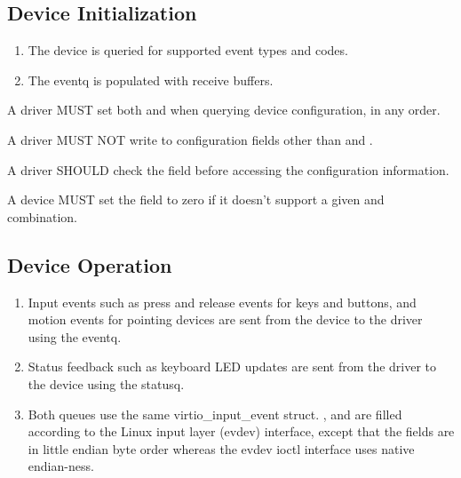 \subsection{Device Initialization}\label{sec:Device Types / Input Device / Device Initialization}

\begin{enumerate}
\item The device is queried for supported event types and codes.
\item The eventq is populated with receive buffers.
\end{enumerate}

A driver MUST set both  and  when querying
  device configuration, in any order.

A driver MUST NOT write to configuration fields other than 
  and .

A driver SHOULD check the  field before accessing the
  configuration information.

A device MUST set the  field to zero if it doesn't support a
  given  and  combination.

\subsection{Device Operation}\label{sec:Device Types / Input Device / Device Operation}

\begin{enumerate}
\item Input events such as press and release events for keys and
  buttons, and motion events for pointing devices are sent from
  the device to the driver using the eventq.
\item Status feedback such as keyboard LED updates are sent from the
  driver to the device using the statusq.
\item Both queues use the same virtio_input_event struct.
  ,  and  are filled according to
  the Linux input layer (evdev) interface, except that the fields are
  in little endian byte order whereas the evdev ioctl interface uses
  native endian-ness.
\end{enumerate}

